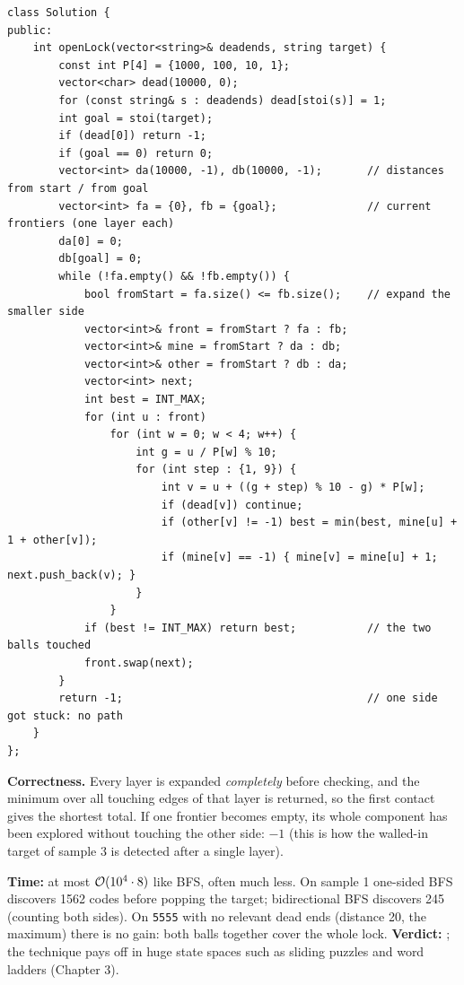 \begin{alternativebox}
\begin{lstlisting}[style=cpp]
class Solution {
public:
    int openLock(vector<string>& deadends, string target) {
        const int P[4] = {1000, 100, 10, 1};
        vector<char> dead(10000, 0);
        for (const string& s : deadends) dead[stoi(s)] = 1;
        int goal = stoi(target);
        if (dead[0]) return -1;
        if (goal == 0) return 0;
        vector<int> da(10000, -1), db(10000, -1);       // distances from start / from goal
        vector<int> fa = {0}, fb = {goal};              // current frontiers (one layer each)
        da[0] = 0;
        db[goal] = 0;
        while (!fa.empty() && !fb.empty()) {
            bool fromStart = fa.size() <= fb.size();    // expand the smaller side
            vector<int>& front = fromStart ? fa : fb;
            vector<int>& mine = fromStart ? da : db;
            vector<int>& other = fromStart ? db : da;
            vector<int> next;
            int best = INT_MAX;
            for (int u : front)
                for (int w = 0; w < 4; w++) {
                    int g = u / P[w] % 10;
                    for (int step : {1, 9}) {
                        int v = u + ((g + step) % 10 - g) * P[w];
                        if (dead[v]) continue;
                        if (other[v] != -1) best = min(best, mine[u] + 1 + other[v]);
                        if (mine[v] == -1) { mine[v] = mine[u] + 1; next.push_back(v); }
                    }
                }
            if (best != INT_MAX) return best;           // the two balls touched
            front.swap(next);
        }
        return -1;                                      // one side got stuck: no path
    }
};
\end{lstlisting}

\textbf{Correctness.} Every layer is expanded \emph{completely} before checking, and the minimum over all touching edges of that layer is returned, so the first contact gives the shortest total. If one frontier becomes empty, its whole component has been explored without touching the other side: $-1$ (this is how the walled-in target of sample 3 is detected after a single layer).

\begin{complexitybox}
\textbf{Time:} at most $\mathcal{O}(10^4 \cdot 8)$ like BFS, often much less. On sample 1 one-sided BFS discovers 1562 codes before popping the target; bidirectional BFS discovers 245 (counting both sides). On \texttt{5555} with no relevant dead ends (distance 20, the maximum) there is no gain: both balls together cover the whole lock. \textbf{Verdict:} \ac{}; the technique pays off in huge state spaces such as sliding puzzles and word ladders (Chapter 3).
\end{complexitybox}
\end{alternativebox}


